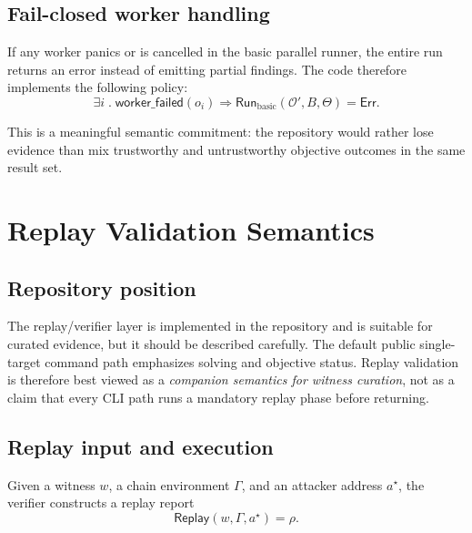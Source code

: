 \documentclass[11pt]{article}
\numberwithin{equation}{section}
\theoremstyle{remark}
\newcommand{\Ctx}{\Theta}
\newcommand{\Replay}{\mathsf{Replay}}
\newcommand{\Objectives}{\mathcal{O}}
\begin{document}
\subsection{Fail-closed worker handling}

If any worker panics or is cancelled in the basic parallel runner, the entire run returns an error instead of emitting partial findings. The code therefore implements the following policy:
\begin{equation}
\label{eq:worker-fail-closed}
\exists i \;.\; \mathsf{worker\_failed}(o_i)
\Longrightarrow
\mathsf{Run}_{\mathrm{basic}}(\Objectives',B,\Ctx) = \mathsf{Err}.
\end{equation}

This is a meaningful semantic commitment: the repository would rather lose evidence than mix trustworthy and untrustworthy objective outcomes in the same result set.

\section{Replay Validation Semantics}
\label{sec:replay}

\subsection{Repository position}

The replay/verifier layer is implemented in the repository and is suitable for curated evidence, but it should be described carefully. The default public single-target command path emphasizes solving and objective status. Replay validation is therefore best viewed as a \emph{companion semantics for witness curation}, not as a claim that every CLI path runs a mandatory replay phase before returning.

\subsection{Replay input and execution}

Given a witness \(w\), a chain environment \(\Gamma\), and an attacker address \(a^\star\), the verifier constructs a replay report
\begin{equation}
\label{eq:replay}
\Replay(w,\Gamma,a^\star) = \rho.
\end{equation}
\end{document}
